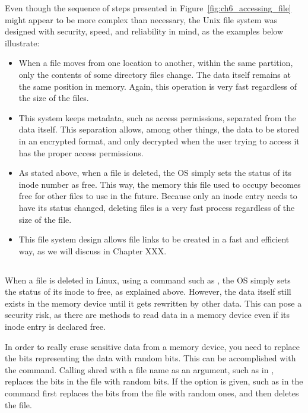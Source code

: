 Even though the sequence of steps presented in Figure~\ref{fig:ch6_accessing_file} might appear to be more complex than necessary, the Unix file system was designed with security, speed, and reliability in mind, as the examples below illustrate:
\begin{itemize}
  \item When a file moves from one location to another, within the same partition,  only the contents of some directory files change. The data itself remains at the same position in memory. Again, this operation is very fast regardless of the size of the files.
  \item This system keeps metadata, such as access permissions, separated from the data itself. This separation allows, among other things, the data to be stored in an encrypted format, and only decrypted when the user trying to access it has the proper access permissions.
  \item As stated above, when a file is deleted, the \acs{OS} simply sets the status of its inode number as free. This way, the memory this file used to occupy becomes free for other files to use in the future. Because only an inode entry needs to have its status changed, deleting files is a very fast process regardless of the size of the file.
  \item This file system design allows file links to be created in a fast and efficient way, as we will discuss in Chapter XXX.
\end{itemize}

\subsection{}
When a file is deleted in Linux, using a command such as , the \acs{OS} simply sets the status of its inode to free, as explained above. However, the data itself still exists in the memory device until it gets rewritten by other data. This can pose a security risk, as there are methods to read data in a memory device even if its inode entry is declared free.

In order to really erase sensitive data from a memory device, you need to replace the bits representing the data with random bits. This can be accomplished with the  command. Calling shred with a file name as an argument, such as in , replaces the bits in the  file with random bits. If the option  is given, such as in  the  command first replaces the bits from the  file with random ones, and then deletes the file.

